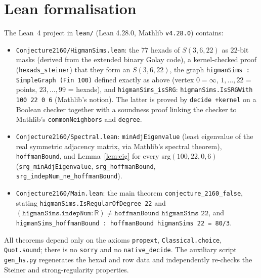 \documentclass[11pt]{article}
\theoremstyle{definition}
\theoremstyle{remark}
\begin{document}
\section{Lean formalisation}
The Lean~4 project in \texttt{lean/} (Lean 4.28.0, Mathlib \texttt{v4.28.0}) contains:
\begin{itemize}
\item \texttt{Conjecture2160/HigmanSims.lean}: the $77$ hexads of $S(3,6,22)$ as $22$-bit masks
(derived from the extended binary Golay code), a kernel-checked proof
(\texttt{hexads\_steiner}) that they form an $S(3,6,22)$, the graph
\texttt{higmanSims : SimpleGraph (Fin 100)} defined exactly as above (vertex $0=\infty$,
$1,\dots,22$ = points, $23,\dots,99$ = hexads), and \texttt{higmanSims\_isSRG}:
\texttt{higmanSims.IsSRGWith 100 22 0 6} (Mathlib's notion). The latter is proved by
\texttt{decide +kernel} on a Boolean checker together with a soundness proof linking the
checker to Mathlib's \texttt{commonNeighbors} and \texttt{degree}.
\item \texttt{Conjecture2160/Spectral.lean}: \texttt{minAdjEigenvalue} (least eigenvalue of the
real symmetric adjacency matrix, via Mathlib's spectral theorem), \texttt{hoffmanBound}, and
Lemma~\ref{lem:eig} for every srg$(100,22,0,6)$
(\texttt{srg\_minAdjEigenvalue}, \texttt{srg\_hoffmanBound}, \texttt{srg\_indepNum\_ne\_hoffmanBound}).
\item \texttt{Conjecture2160/Main.lean}: the main theorem
\texttt{conjecture\_2160\_false}, stating
\texttt{higmanSims.IsRegularOfDegree 22} and
\((\texttt{higmanSims.indepNum} : \mathbb{R}) \neq \texttt{hoffmanBound higmanSims 22}\),
and \texttt{higmanSims\_hoffmanBound : hoffmanBound higmanSims 22 = 80/3}.
\end{itemize}
All theorems depend only on the axioms \texttt{propext}, \texttt{Classical.choice},
\texttt{Quot.sound}; there is no \texttt{sorry} and no \texttt{native\_decide}. The auxiliary
script \texttt{gen\_hs.py} regenerates the hexad and row data and independently re-checks the
Steiner and strong-regularity properties.
\end{document}
